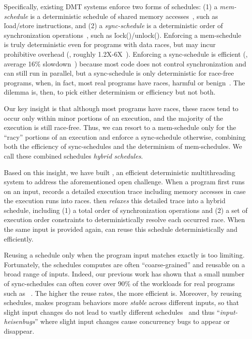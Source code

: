 Specifically, existing DMT systems enforce two forms of schedules: (1) a
\emph{mem-schedule} is a deterministic schedule of shared memory
accesses~\cite{dmp:asplos09,coredet:asplos10,dos:osdi10}, such as
\v{load/store} instructions, and (2) a \emph{sync-schedule} is a
deterministic order of synchronization
operations~\cite{kendo:asplos09,cui:tern:osdi10}, such as
\v{lock()/unlock()}.  Enforcing a mem-schedule is truly deterministic even
for programs with data races, but may incur prohibitive overhead (\eg,
roughly 1.2X-6X~\cite{coredet:asplos10}).  Enforcing a sync-schedule is
efficient (\eg, average 16\% slowdown~\cite{kendo:asplos09}) because
most code does not control synchronization and can still run in
parallel, but a sync-schedule is only deterministic for race-free
programs, when, in fact, most real programs have races, harmful or
benign~\cite{lu:concurrency-bugs,syncfinder:osdi10}.  The dilemma is,
then, to pick either determinism or efficiency but not both.

Our key insight is that although most programs have races, these races
tend to occur only within minor portions of an execution, and the majority
of the execution is still race-free.  Thus, we can resort to a
mem-schedule only for the ``racy'' portions of an execution and enforce a
sync-schedule otherwise, combining both the efficiency of sync-schedules
and the determinism of mem-schedules. We call these combined schedules
\emph{hybrid schedules}.

Based on this insight, we have built \peregrine, an efficient deterministic
multithreading system to address the aforementioned open challenge.
When a program first runs on an input, \peregrine
records a detailed execution trace
including memory accesses in case the execution runs into races.
\peregrine then \emph{relaxes} this detailed trace into a hybrid schedule,
including (1) a total order of synchronization operations and (2) a set of
execution order constraints to
deterministically resolve each occurred race.  When the same input is provided 
again, \peregrine can reuse this schedule deterministically and efficiently.

Reusing a schedule only when the program input matches exactly is too
limiting.  Fortunately, the schedules \peregrine computes are often
``coarse-grained'' and
reusable on a broad range of inputs.  Indeed, our previous work has shown
that a small number of sync-schedules can often cover over 90\% of the
workloads for real programs such as \apache~\cite{cui:tern:osdi10}.  The
higher the reuse rates, the more efficient \peregrine is.  Moreover, by reusing
schedules, \peregrine makes program behaviors more \emph{stable} across
different inputs, so that slight input changes do not lead to vastly
different schedules~\cite{cui:tern:osdi10} and thus ``\emph{input-heisenbugs}''
where slight input changes cause concurrency bugs to appear or disappear.

